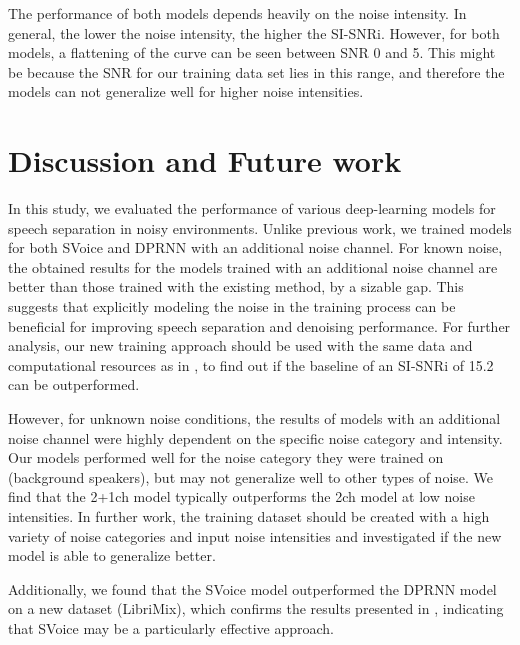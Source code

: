 \documentclass{article}
\begin{document}
The performance of both models depends heavily on the noise intensity. In general, the lower the noise intensity, the higher the SI-SNRi. However, for both models, a flattening of the curve can be seen between SNR 0 and 5. This might be because the SNR for our training data set lies in this range, and therefore the models can not generalize well for higher noise intensities. 




\vfill
\pagebreak


\section{Discussion and Future work}
\label{sec:discussion}
In this study, we evaluated the performance of various deep-learning models for speech separation in noisy environments. Unlike previous work, we trained models for both SVoice and DPRNN with an additional noise channel. For known noise, the obtained results for the models trained with an additional noise channel are better than those trained with the existing method, by a sizable gap. This suggests that explicitly modeling the noise in the training process can be beneficial for improving speech separation and denoising performance. For further analysis, our new training approach should be used with the same data and computational resources as in \cite{Svoice}, to find out if the baseline of an SI-SNRi of 15.2 can be outperformed.

However, for unknown noise conditions, the results of models with an additional noise channel were highly dependent on the specific noise category and intensity. Our models performed well for the noise category they were trained on (background speakers), but may not generalize well to other types of noise. We find that the 2+1ch model typically outperforms the 2ch model at low noise intensities. In further work, the training dataset should be created with a high variety of noise categories and input noise intensities and investigated if the new model is able to generalize better.

Additionally, we found that the SVoice model outperformed the DPRNN model on a new dataset (LibriMix), which confirms the results presented in \cite{Svoice}, indicating that SVoice may be a particularly effective approach. 
\end{document}
